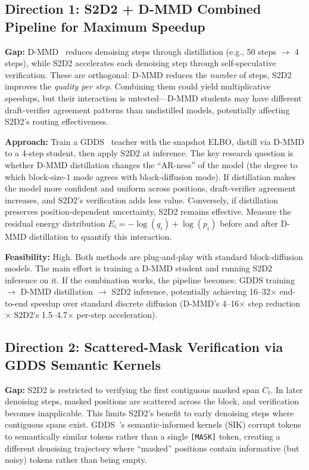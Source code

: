 \documentclass[11pt]{article}
\begin{document}
\subsection{Direction 1: S2D2 + D-MMD Combined Pipeline for Maximum Speedup}

\textbf{Gap:} D-MMD~\cite{dmmd} reduces denoising steps through distillation (e.g., 50 steps $\to$ 4 steps), while S2D2 accelerates each denoising step through self-speculative verification. These are orthogonal: D-MMD reduces the \textit{number} of steps, S2D2 improves the \textit{quality per step}. Combining them could yield multiplicative speedups, but their interaction is untested---D-MMD students may have different draft-verifier agreement patterns than undistilled models, potentially affecting S2D2's routing effectiveness.

\textbf{Approach:} Train a GDDS~\cite{gdds} teacher with the snapshot ELBO, distill via D-MMD to a 4-step student, then apply S2D2 at inference. The key research question is whether D-MMD distillation changes the ``AR-ness'' of the model (the degree to which block-size-1 mode agrees with block-diffusion mode). If distillation makes the model more confident and uniform across positions, draft-verifier agreement increases, and S2D2's verification adds less value. Conversely, if distillation preserves position-dependent uncertainty, S2D2 remains effective. Measure the residual energy distribution $E_i = -\log(q_i) + \log(p_i)$ before and after D-MMD distillation to quantify this interaction.

\textbf{Feasibility:} High. Both methods are plug-and-play with standard block-diffusion models. The main effort is training a D-MMD student and running S2D2 inference on it. If the combination works, the pipeline becomes: GDDS training $\to$ D-MMD distillation $\to$ S2D2 inference, potentially achieving 16--32$\times$ end-to-end speedup over standard discrete diffusion (D-MMD's 4--16$\times$ step reduction $\times$ S2D2's 1.5--4.7$\times$ per-step acceleration).

\subsection{Direction 2: Scattered-Mask Verification via GDDS Semantic Kernels}

\textbf{Gap:} S2D2 is restricted to verifying the first contiguous masked span $C_t$. In later denoising steps, masked positions are scattered across the block, and verification becomes inapplicable. This limits S2D2's benefit to early denoising steps where contiguous spans exist. GDDS~\cite{gdds}'s semantic-informed kernels (SIK) corrupt tokens to semantically similar tokens rather than a single \texttt{[MASK]} token, creating a different denoising trajectory where ``masked'' positions contain informative (but noisy) tokens rather than being empty.
\end{document}
